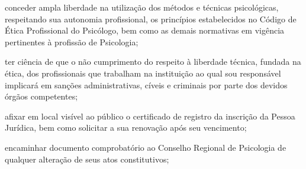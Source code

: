 \documentclass[openright, oneside, a4paper, article, 10pt, brazil]{abntex2}
\begin{document}
\begin{minipage}[c]{\boxlarg}
\CheckBox[%
    name=liberdade,
    bordercolor=black,
    height=12pt,
    width=12pt]
    {\null}
\end{minipage}%
\begin{minipage}[c]{\linewidth-1.72\boxlarg}
conceder ampla liberdade na utilização dos métodos e técnicas psicológicas, respeitando sua autonomia profissional,
    os princípios estabelecidos no Código de Ética Profissional do Psicólogo, bem como as demais normativas em
    vigência pertinentes à profissão de Psicologia;
\end{minipage}\vspace{\baselineskip}

\begin{minipage}[c]{\boxlarg}
\CheckBox[%
    name=ciencia_liberdade,
    bordercolor=black,
    height=12pt,
    width=12pt]
    {\null}
\end{minipage}%
\begin{minipage}[c]{\linewidth-1.72\boxlarg}
ter ciência de que o não cumprimento do respeito à liberdade técnica, fundada na ética, dos profissionais que
    trabalham na instituição ao qual sou responsável implicará em sanções administrativas, cíveis e criminais por
    parte dos devidos órgãos competentes;
\end{minipage}\vspace{\baselineskip}

    \begin{minipage}[c]{\boxlarg}
\CheckBox[%
    name=afixar_local,
    bordercolor=black,
    height=12pt,
    width=12pt]
    {\null}
\end{minipage}%
\begin{minipage}[c]{\linewidth-1.72\boxlarg}
afixar em local visível ao público o certificado de registro da inscrição da Pessoa Jurídica, bem como solicitar
    a sua renovação após seu vencimento;
\end{minipage}\vspace{\baselineskip}

    \begin{minipage}[c]{\boxlarg}
\CheckBox[%
    name=documento_comprobatorio,
    bordercolor=black,
    height=12pt,
    width=12pt]
    {\null}
\end{minipage}%
\begin{minipage}[c]{\linewidth-1.72\boxlarg}
encaminhar documento comprobatório ao Conselho Regional de Psicologia de qualquer alteração de seus
atos constitutivos;
\end{minipage}\vspace{\baselineskip}
\end{document}
